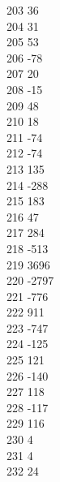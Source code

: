 { 203	36 \\
 204	31 \\
 205	53 \\
 206	-78 \\
 207	20 \\
 208	-15 \\
 209	48 \\
 210	18 \\
 211	-74 \\
 212	-74 \\
 213	135 \\
 214	-288 \\
 215	183 \\
 216	47 \\
 217	284 \\
 218	-513 \\
 219	3696 \\
 220	-2797 \\
 221	-776 \\
 222	911 \\
 223	-747 \\
 224	-125 \\
 225	121 \\
 226	-140 \\
 227	118 \\
 228	-117 \\
 229	116 \\
 230	4 \\
 231	4 \\
 232	24 \\
}
